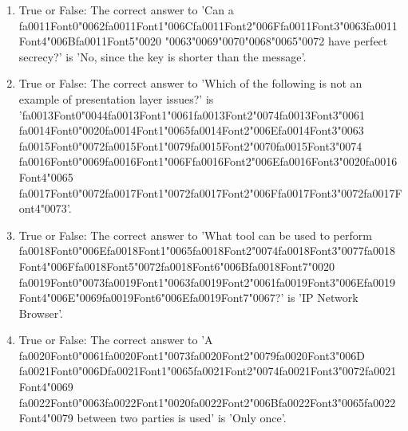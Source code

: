 \documentclass[12pt]{article}
\begin{document}
\begin{enumerate}[label=\arabic*.]
\item True or False: The correct answer to 'Can a {\csname fa0011Font0\endcsname\char"0062}{\csname fa0011Font1\endcsname\char"006C}{\csname fa0011Font2\endcsname\char"006F}{\csname fa0011Font3\endcsname\char"0063}{\csname fa0011Font4\endcsname\char"006B}{\csname fa0011Font5\endcsname\char"0020} {\char"0063}{\char"0069}{\char"0070}{\char"0068}{\char"0065}{\char"0072} have perfect secrecy?' is 'No, since the key is shorter than the message'.
\item True or False: The correct answer to 'Which of the following is not an example of presentation layer issues?' is '{\csname fa0013Font0\endcsname\char"0044}{\csname fa0013Font1\endcsname\char"0061}{\csname fa0013Font2\endcsname\char"0074}{\csname fa0013Font3\endcsname\char"0061} {\csname fa0014Font0\endcsname\char"0020}{\csname fa0014Font1\endcsname\char"0065}{\csname fa0014Font2\endcsname\char"006E}{\csname fa0014Font3\endcsname\char"0063} {\csname fa0015Font0\endcsname\char"0072}{\csname fa0015Font1\endcsname\char"0079}{\csname fa0015Font2\endcsname\char"0070}{\csname fa0015Font3\endcsname\char"0074} {\csname fa0016Font0\endcsname\char"0069}{\csname fa0016Font1\endcsname\char"006F}{\csname fa0016Font2\endcsname\char"006E}{\csname fa0016Font3\endcsname\char"0020}{\csname fa0016Font4\endcsname\char"0065} {\csname fa0017Font0\endcsname\char"0072}{\csname fa0017Font1\endcsname\char"0072}{\csname fa0017Font2\endcsname\char"006F}{\csname fa0017Font3\endcsname\char"0072}{\csname fa0017Font4\endcsname\char"0073}'.
\item True or False: The correct answer to 'What tool can be used to perform {\csname fa0018Font0\endcsname\char"006E}{\csname fa0018Font1\endcsname\char"0065}{\csname fa0018Font2\endcsname\char"0074}{\csname fa0018Font3\endcsname\char"0077}{\csname fa0018Font4\endcsname\char"006F}{\csname fa0018Font5\endcsname\char"0072}{\csname fa0018Font6\endcsname\char"006B}{\csname fa0018Font7\endcsname\char"0020} {\csname fa0019Font0\endcsname\char"0073}{\csname fa0019Font1\endcsname\char"0063}{\csname fa0019Font2\endcsname\char"0061}{\csname fa0019Font3\endcsname\char"006E}{\csname fa0019Font4\endcsname\char"006E}{\char"0069}{\csname fa0019Font6\endcsname\char"006E}{\csname fa0019Font7\endcsname\char"0067}?' is 'IP Network Browser'.
\item True or False: The correct answer to 'A {\csname fa0020Font0\endcsname\char"0061}{\csname fa0020Font1\endcsname\char"0073}{\csname fa0020Font2\endcsname\char"0079}{\csname fa0020Font3\endcsname\char"006D} {\csname fa0021Font0\endcsname\char"006D}{\csname fa0021Font1\endcsname\char"0065}{\csname fa0021Font2\endcsname\char"0074}{\csname fa0021Font3\endcsname\char"0072}{\csname fa0021Font4\endcsname\char"0069} {\csname fa0022Font0\endcsname\char"0063}{\csname fa0022Font1\endcsname\char"0020}{\csname fa0022Font2\endcsname\char"006B}{\csname fa0022Font3\endcsname\char"0065}{\csname fa0022Font4\endcsname\char"0079} between two parties is used' is 'Only once'.

\end{enumerate}
\end{document}

